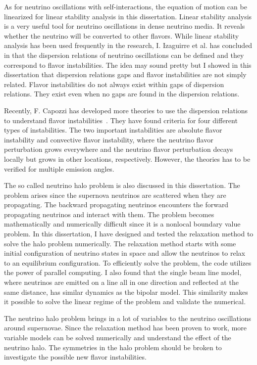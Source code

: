 As for neutrino oscillations with self-interactions, the equation of motion can be linearized for linear stability analysis in this dissertation. Linear stability analysis is a very useful tool for neutrino oscillations in dense neutrino media. It reveals whether the neutrino will be converted to other flavors. While linear stability analysis has been used frequently in the research, I. Izaguirre et al. has concluded in \cite{Izaguirre2016a} that the dispersion relations of neutrino oscillations can be defined and they correspond to flavor instabilities. The idea may sound pretty but I showed in this dissertation that dispersion relations gaps and flavor instabilities are not simply related. Flavor instabilities do not always exist within gaps of dispersion relations. They exist even when no gaps are found in the dispersion relations.

Recently, F. Capozzi has developed more theories to use the dispersion relations to understand flavor instabilities~\cite{Capozzi2017}. They have found criteria for four different types of instabilities. The two important instabilities are absolute flavor instability and convective flavor instability, where the neutrino flavor perturbation grows everywhere and the neutrino flavor perturbation decays locally but grows in other locations, respectively. However, the theories has to be verified for multiple emission angles.


The so called neutrino halo problem is also discussed in this dissertation. The problem arises since the supernova neutrinos are scattered when they are propagating. The backward propagating neutrinos encounters the forward propagating neutrinos and interact with them. The problem becomes mathematically and numerically difficult since it is a nonlocal boundary value problem. In this dissertation, I have designed and tested the relaxation method to solve the halo problem numerically. The relaxation method starts with some initial configuration of neutrino states in space and allow the neutrinos to relax to an equilibrium configuration. To efficiently solve the problem, the code utilizes the power of parallel computing. I also found that the single beam line model, where neutrinos are emitted on a line all in one direction and reflected at the same distance, has similar dynamics as the bipolar model. This similarity makes it possible to solve the linear regime of the problem and validate the numerical.

The neutrino halo problem brings in a lot of variables to the neutrino oscillations around supernovae. Since the relaxation method has been proven to work, more variable models can be solved numerically and understand the effect of the neutrino halo. The symmetries in the halo problem should be broken to investigate the possible new flavor instabilities.

